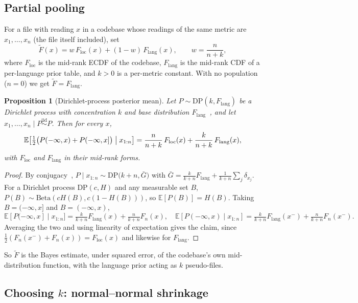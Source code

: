 \documentclass[11pt]{article}
\newtheorem{proposition}{Proposition}
\theoremstyle{remark}
\newcommand{\Floc}{F_{\mathrm{loc}}}
\newcommand{\Flang}{F_{\mathrm{lang}}}
\newcommand{\Ft}{\tilde F}
\begin{document}
\subsection{Partial pooling}

For a file with reading $x$ in a codebase whose readings of the same metric are
$x_1, \dots, x_n$ (the file itself included), set
\[
\Ft(x) = w\,\Floc(x) + (1 - w)\,\Flang(x), \qquad w = \frac{n}{n + k},
\]
where $\Floc$ is the mid-rank ECDF of the codebase, $\Flang$ is the mid-rank
CDF of a per-language prior table, and $k > 0$ is a per-metric constant.
With no population ($n = 0$) we get $\Ft = \Flang$.

\begin{proposition}[Dirichlet-process posterior mean]\label{prop:dp}
Let $P \sim \mathrm{DP}(k, \Flang)$ be a Dirichlet process with concentration
$k$ and base distribution $\Flang$~\cite{ferguson1973}, and let
$x_1, \dots, x_n \mid P \stackrel{\text{iid}}{\sim} P$. Then for every $x$,
\[
\mathbb E\bigl[\tfrac12\bigl(P(-\infty, x) + P(-\infty, x]\bigr) \bigm| x_{1:n}\bigr]
= \frac{n}{n+k}\,\Floc(x) + \frac{k}{n+k}\,\Flang(x),
\]
with $\Floc$ and $\Flang$ in their mid-rank forms.
\end{proposition}

\begin{proof}
By conjugacy~\cite{ferguson1973}, $P \mid x_{1:n} \sim \mathrm{DP}\bigl(k + n,
\bar G\bigr)$ with
$\bar G = \frac{k}{k+n}\Flang + \frac{1}{k+n}\sum_{j} \delta_{x_j}$. For a
Dirichlet process $\mathrm{DP}(c, H)$ and any measurable set $B$,
$P(B) \sim \mathrm{Beta}(cH(B), c(1 - H(B)))$, so $\mathbb E[P(B)] = H(B)$.
Taking $B = (-\infty, x]$ and $B = (-\infty, x)$,
\[
\mathbb E[P(-\infty, x] \mid x_{1:n}] = \tfrac{k}{k+n}\Flang(x) + \tfrac{n}{k+n} F_n(x),
\quad
\mathbb E[P(-\infty, x) \mid x_{1:n}] = \tfrac{k}{k+n}\Flang(x^-) + \tfrac{n}{k+n} F_n(x^-).
\]
Averaging the two and using linearity of expectation gives the claim, since
$\tfrac12(F_n(x^-) + F_n(x)) = \Floc(x)$ and likewise for $\Flang$.
\end{proof}

So $\Ft$ is the Bayes estimate, under squared error, of the codebase's own
mid-distribution function, with the language prior acting as $k$ pseudo-files.

\subsection{\texorpdfstring{Choosing $k$}{Choosing k}: normal--normal shrinkage}
\end{document}
